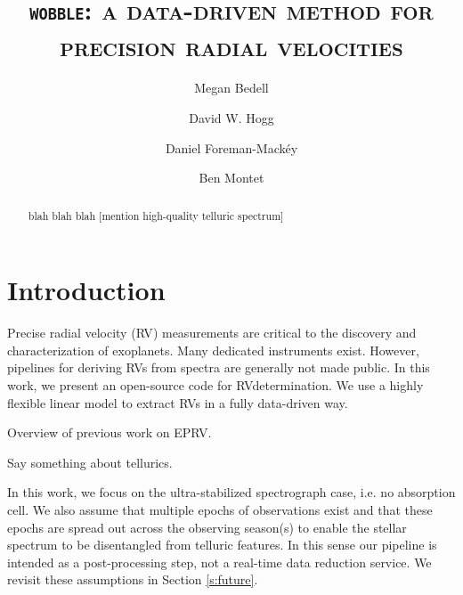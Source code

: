 \documentclass[twocolumn]{aastex62}
\newcommand{\acronym}[1]{{\small{#1}}}
\newcommand{\RV}{\acronym{RV}}
\newcommand{\wobble}{\texttt{wobble}}
\begin{document}
\graphicspath{ {../figures/} }

\title{\textsc{\wobble: a data-driven method for precision radial velocities}}

\author[0000-0001-9907-7742]{Megan Bedell}

\author[0000-0003-2866-9403]{David W. Hogg}

\author{Daniel Foreman-Mack\'{e}y}

\author{Ben Montet}


\begin{abstract}
blah blah blah [mention high-quality telluric spectrum]
\end{abstract}

\section{Introduction}

Precise radial velocity (\RV) measurements are critical to the discovery and characterization of exoplanets. Many dedicated instruments exist. However, pipelines for deriving \RV s from spectra are generally not made public. In this work, we present an open-source code for \RV determination. We use a highly flexible linear model to extract \RV s in a fully data-driven way. %

Overview of previous work on \acronym{EPRV}.

Say something about tellurics.

In this work, we focus on the ultra-stabilized spectrograph case, i.e. no absorption cell. We also assume that multiple epochs of observations exist and that these epochs are spread out across the observing season(s) to enable the stellar spectrum to be disentangled from telluric features. In this sense our pipeline is intended as a post-processing step, not a real-time data reduction service. We revisit these assumptions in Section \ref{s:future}.
\end{document}
